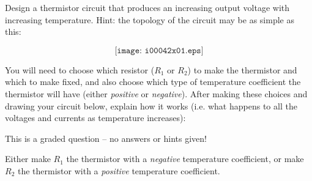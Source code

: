 

Design a thermistor circuit that produces an increasing output voltage with increasing temperature.  Hint: the topology of the circuit may be as simple as this:

$$\texttt{[image: i00042x01.eps]}$$

You will need to choose which resistor ($R_1$ or $R_2$) to make the thermistor and which to make fixed, and also choose which type of temperature coefficient the thermistor will have (either {\it positive} or {\it negative}).  After making these choices and drawing your circuit below, explain how it works (i.e. what happens to all the voltages and currents as temperature increases):

\vfil 

\eject






This is a graded question -- no answers or hints given!







Either make $R_1$ the thermistor with a {\it negative} temperature coefficient, or make $R_2$ the thermistor with a {\it positive} temperature coefficient.




